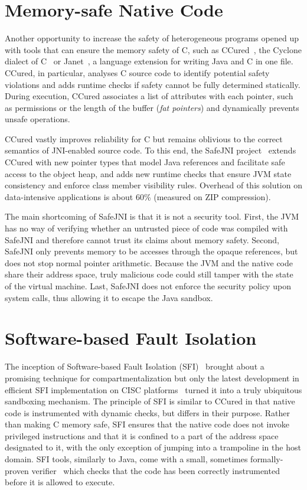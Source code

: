 \documentclass[a4paper,12pt,twoside,openright]{report}
\begin{document}
\section{Memory-safe Native Code}

Another opportunity to increase the safety of heterogeneous programs opened up with tools that can ensure the memory safety of C, such as CCured~\cite{necula2002ccured, Condit:2003:CRW:781131.781157}, the Cyclone dialect of C~\cite{Jim:2002:CSD:647057.713871} or Janet~\cite{Bubak:2001:CJN:1239921.1239925}, a language extension for writing Java and C in one file. CCured, in particular, analyses C source code to identify potential safety violations and adds runtime checks if safety cannot be fully determined statically. During execution, CCured associates a list of attributes with each pointer, such as permissions or the length of the buffer (\emph{fat pointers}) and dynamically prevents unsafe operations. 

CCured vastly improves reliability for C but remains oblivious to the correct semantics of JNI-enabled source code. To this end, the SafeJNI project~\cite{Tan06safejava} extends CCured with new pointer types that model Java references and facilitate safe access to the object heap, and adds new runtime checks that ensure JVM state consistency and enforce class member visibility rules. Overhead of this solution on data-intensive applications is about 60\% (measured on ZIP compression).

The main shortcoming of SafeJNI is that it is not a security tool. First, the JVM has no way of verifying whether an untrusted piece of code was compiled with SafeJNI and therefore cannot trust its claims about memory safety. Second, SafeJNI only prevents memory to be accesses through the opaque references, but does not stop normal pointer arithmetic. Because the JVM and the native code share their address space, truly malicious code could still tamper with the state of the virtual machine. Last, SafeJNI does not enforce the security policy upon system calls, thus allowing it to escape the Java sandbox.

\section{Software-based Fault Isolation}

The inception of Software-based Fault Isolation (SFI)~\cite{Wahbe:1993:ESF:168619.168635} brought about a promising technique for compartmentalization but only the latest development in efficient SFI implementation on CISC platforms~\cite{McCamant:2006:ESC:1267336.1267351} turned it into a truly ubiquitous sandboxing mechanism. The principle of SFI is similar to CCured in that native code is instrumented with dynamic checks, but differs in their purpose. Rather than making C memory safe, SFI ensures that the native code does not invoke privileged instructions and that it is confined to a part of the address space designated to it, with the only exception of jumping into a trampoline in the host domain. SFI tools, similarly to Java, come with a small, sometimes formally-proven verifier~\cite{Morrisett:2012:RBF:2254064.2254111} which checks that the code has been correctly instrumented before it is allowed to execute.
\end{document}
